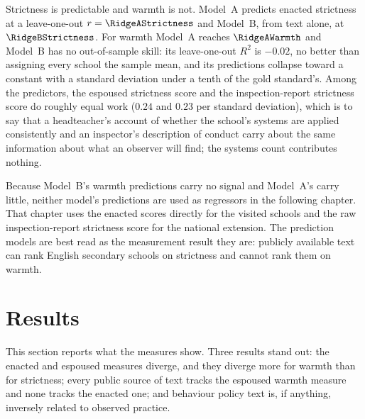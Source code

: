 Strictness is predictable and warmth is not. Model~A predicts enacted
strictness at a leave-one-out $r = \RidgeAStrictness$ and Model~B, from text
alone, at $\RidgeBStrictness$. For warmth Model~A reaches $\RidgeAWarmth$ and
Model~B has no out-of-sample skill: its leave-one-out $R^2$ is $-0.02$, no
better than assigning every school the sample mean, and its predictions
collapse toward a constant with a standard deviation under a tenth of the
gold standard's. Among the predictors, the espoused strictness score and the
inspection-report strictness score do roughly equal work ($0.24$ and $0.23$
per standard deviation), which is to say that a headteacher's account of
whether the school's systems are applied consistently and an inspector's
description of conduct carry about the same information about what an
observer will find; the systems count contributes nothing.





Because Model~B's warmth predictions carry no signal and Model~A's carry
little, neither model's predictions are used as regressors in the following
chapter. That chapter uses the enacted scores directly for the visited
schools and the raw inspection-report strictness score for the national
extension. The prediction models are best read as the measurement result they
are: publicly available text can rank English secondary schools on strictness
and cannot rank them on warmth.

\section{Results}
\label{sec:p1_results}

This section reports what the measures show. Three results stand out: the
enacted and espoused measures diverge, and they diverge more for warmth than
for strictness; every public source of text tracks the espoused warmth measure
and none tracks the enacted one; and behaviour policy text is, if anything,
inversely related to observed practice.

